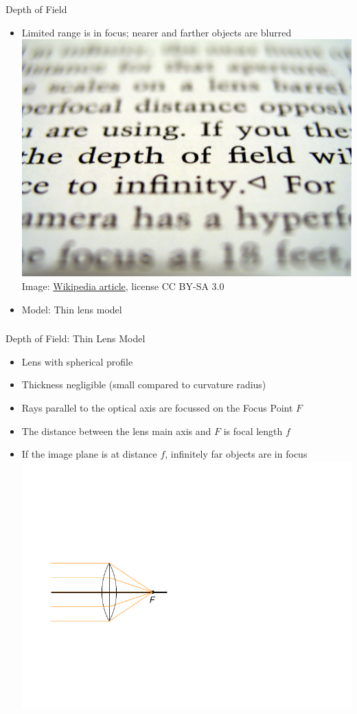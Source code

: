 \documentclass[utf8,stillsansserifmath,fleqn,t]{beamer}
\begin{document}
\begin{frame}[label=dof]
\frametitle{\insertsection}
Depth of Field
\begin{itemize}
\item Limited range is in focus; nearer and farther objects are blurred\\
\includegraphics[width=.6\textwidth]{./fig/depth-of-field.jpg}\\
{\tiny Image: \href{https://en.wikipedia.org/wiki/Depth_of_field}{Wikipedia article}, license CC BY-SA 3.0}
\item Model: Thin lens model
\end{itemize}
\end{frame}

\begin{frame}
\frametitle{\insertsection}
Depth of Field: Thin Lens Model
\begin{itemize}
\item Lens with spherical profile
\item Thickness negligible (small compared to curvature radius)
\item Rays parallel to the optical axis are focussed on the Focus Point $F$
\item The distance between the lens main axis and $F$ is focal length $f$
\item If the image plane is at distance $f$, infinitely far objects are in
focus\\
\includegraphics[width=.5\textwidth]{./fig/thin-lens-0.pdf}
\end{itemize}
\end{frame}
\end{document}
